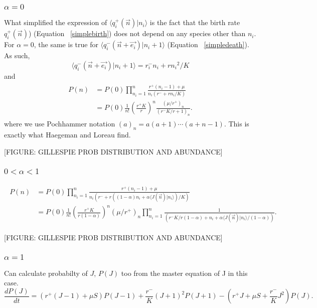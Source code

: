 \documentclass[11pt,a4paper,final]{iopart}
\begin{document}
\subsubsection{$\alpha=0$}
What simplified the expression of $\langle q^+_i(\vec{n}) | n_i \rangle$ is the fact that the birth rate $q^+_i(\vec{n})$) (Equation ~\ref{simplebirth}) does not depend on any species other than $n_i$.
For $\alpha = 0$, the same is true for $\langle q^-_i(\vec{n}+\vec{e_i}) | n_i +1 \rangle$ (Equation ~\ref{simpledeath}). 
As such,
\begin{equation*}
\langle q^-_i(\vec{n}+\vec{e_i}) | n_i + 1 \rangle = r_i^- n_i +  r {n_i}^2/K
\end{equation*}
and
\begin{align}\label{alpha0sol}
\begin{split}
P(n) &= P(0)\prod_{n_i=1}^n \frac{r^+ (n_i-1) + \mu}{n_i(r^- + r n_i/K)} \\
&= P(0) \frac{1}{n!} \left( \frac{r^+ K}{r} \right)^n  \frac{ (\mu/r^+)_{n} }{ (r^-K/r +  1)_{n} }.
\end{split}
\end{align}
where we use Pochhammer notation $(a)_n = a(a+1)\cdots (a+n-1)$.
This is exactly what Haegeman and Loreau find.

[FIGURE: GILLESPIE PROB DISTRIBUTION AND ABUNDANCE]

\subsubsection{$0 < \alpha < 1$}

\begin{align}\label{alpha01sol}
\begin{split}
P(n) &= P(0)\prod_{n_i=1}^n \frac{r^+ (n_i-1) + \mu}{n_i\left( r^- + r \left( (1-\alpha)n_i + \alpha \langle J(\vec{n}) |n_i \rangle \right)/K \right)} \\
&= P(0) \frac{1}{n!} \left( \frac{r^+ K}{r(1-\alpha)} \right)^n  (\mu/r^+)_{n} \prod_{n_i=1}^n \frac{1}{\left( r^-K/r(1-\alpha) + n_i + \alpha \langle J(\vec{n}) |n_i \rangle /(1-\alpha ) \right) }.
\end{split}
\end{align}

[FIGURE: GILLESPIE PROB DISTRIBUTION AND ABUNDANCE]

\subsubsection{$\alpha=1$}
Can calculate probabilty of $J$, $P(J)$ too from the master equation of J in this case.
\begin{equation}
\frac{dP(J)}{dt}=(r^+(J-1) + \mu S) P(J-1) + \frac{r^-}{K}(J+1)^2 P(J+1) - \left( r^+ J + \mu S + \frac{r^-}{K}J^2 \right) P(J).
\end{equation}
\end{document}
